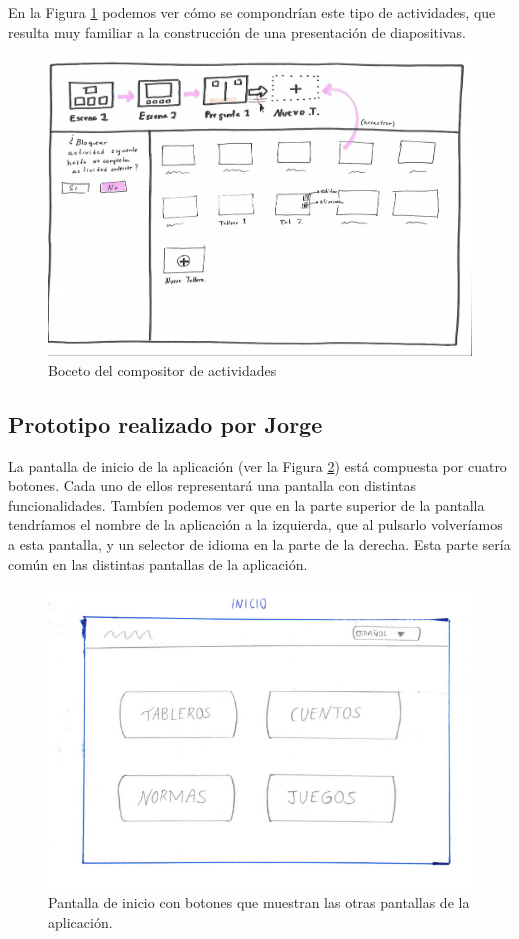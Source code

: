 En la Figura \ref{fig:presentaciontableros} podemos ver cómo se compondrían este tipo de actividades, que resulta muy familiar a la construcción de una presentación de diapositivas.  

\begin{figure}[h!]
	\centering
	\includegraphics[width=0.7\linewidth]{Imagenes/Bitmap/presentacionTableros}
	\caption{Boceto del compositor de actividades}
	\label{fig:presentaciontableros}
\end{figure}


\subsection{Prototipo realizado por Jorge}
\label{cap4:sec:prototipo}
	
	La pantalla de inicio de la aplicación (ver la Figura \ref{fig:iniciojorge}) está compuesta por cuatro botones. Cada uno de ellos representará una pantalla con distintas funcionalidades. Tambíen podemos ver que en la parte superior de la pantalla tendríamos el nombre de la aplicación a la izquierda, que al pulsarlo volveríamos a esta pantalla, y un selector de idioma en la parte de la derecha. Esta parte sería común en las distintas pantallas de la aplicación.
	
	
\begin{figure}[h!]
	\centering
	\includegraphics[width=0.7\linewidth]{Imagenes/Bitmap/inicioJorge}
	\caption{Pantalla de inicio con botones que muestran las otras pantallas de la aplicación.}
	\label{fig:iniciojorge}
\end{figure}

